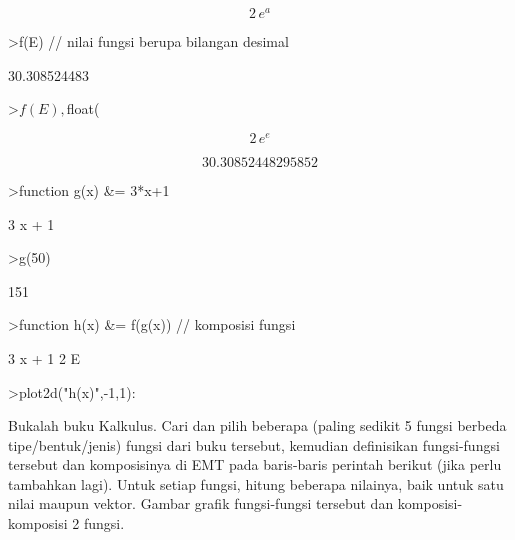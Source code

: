\documentclass[a4paper,10pt]{article}
\begin{document}
\begin{eulernotebook}
\begin{euleroutput}
\end{euleroutput}
\begin{eulerformula}
\[
2\,e^{a}
\]
\end{eulerformula}
\begin{eulerprompt}
>f(E) // nilai fungsi berupa bilangan desimal
\end{eulerprompt}
\begin{euleroutput}
  30.308524483
\end{euleroutput}
\begin{eulerprompt}
>$f(E), $float(%
\end{eulerprompt}
\begin{eulerformula}
\[
2\,e^{e}
\]
\end{eulerformula}
\begin{eulerformula}
\[
30.30852448295852
\]
\end{eulerformula}
\begin{eulerprompt}
>function g(x) &= 3*x+1
\end{eulerprompt}
\begin{euleroutput}
  
                                 3 x + 1
  
\end{euleroutput}
\begin{eulerprompt}
>g(50)
\end{eulerprompt}
\begin{euleroutput}
  151
\end{euleroutput}
\begin{eulerprompt}
>function h(x) &= f(g(x)) // komposisi fungsi
\end{eulerprompt}
\begin{euleroutput}
  
                                   3 x + 1
                                2 E
  
\end{euleroutput}
\begin{eulerprompt}
>plot2d("h(x)",-1,1):
\end{eulerprompt}
\begin{eulercomment}
Bukalah buku Kalkulus. Cari dan pilih beberapa (paling sedikit 5 fungsi berbeda
tipe/bentuk/jenis) fungsi dari buku tersebut, kemudian definisikan fungsi-fungsi tersebut dan
komposisinya di EMT pada baris-baris perintah berikut (jika perlu tambahkan lagi). Untuk setiap
fungsi, hitung beberapa nilainya, baik untuk satu nilai maupun vektor. Gambar grafik
fungsi-fungsi tersebut dan komposisi-komposisi 2 fungsi.


\end{eulercomment}
\end{eulernotebook}
\end{document}

